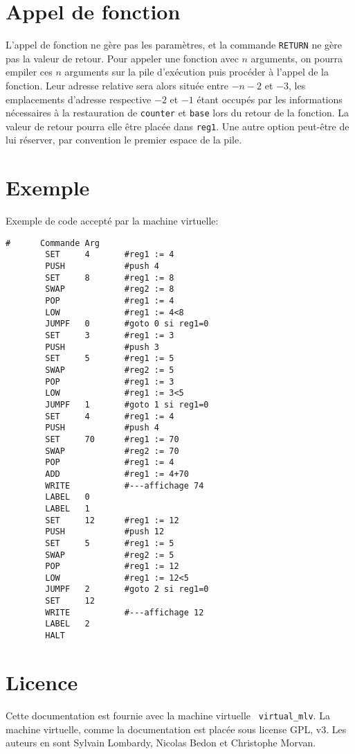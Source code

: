 \documentclass[12pt,a4]{article}
\begin{document}
\section{Appel de fonction}
L'appel de fonction ne gère pas les paramètres, et la commande
{\tt RETURN} ne gère pas la valeur de retour.  Pour appeler une
fonction avec $n$ arguments, on pourra empiler ces $n$ arguments sur
la pile d'exécution puis procéder à l'appel de la fonction. Leur
adresse relative sera alors située entre $-n-2$ et $-3$, les
emplacements d'adresse respective $-2$ et $-1$ étant occupés par les
informations nécessaires à la restauration de {\tt counter} et
{\tt base} lors du retour de la fonction.  La valeur de retour pourra
elle être placée dans {\tt reg1}. Une autre option peut-être de lui
réserver, par convention le premier espace de la pile.

\section{Exemple}
Exemple de code accepté par la machine virtuelle:
\begin{verbatim}
#      Commande Arg
        SET     4       #reg1 := 4
        PUSH            #push 4
        SET     8       #reg1 := 8
        SWAP            #reg2 := 8
        POP             #reg1 := 4
        LOW             #reg1 := 4<8
        JUMPF   0       #goto 0 si reg1=0
        SET     3       #reg1 := 3
        PUSH            #push 3
        SET     5       #reg1 := 5
        SWAP            #reg2 := 5
        POP             #reg1 := 3
        LOW             #reg1 := 3<5
        JUMPF   1       #goto 1 si reg1=0
        SET     4       #reg1 := 4
        PUSH            #push 4
        SET     70      #reg1 := 70
        SWAP            #reg2 := 70
        POP             #reg1 := 4
        ADD             #reg1 := 4+70
        WRITE           #---affichage 74
        LABEL   0
        LABEL   1
        SET     12      #reg1 := 12
        PUSH            #push 12
        SET     5       #reg1 := 5
        SWAP            #reg2 := 5
        POP             #reg1 := 12 
        LOW             #reg1 := 12<5
        JUMPF   2       #goto 2 si reg1=0
        SET     12
        WRITE           #---affichage 12
        LABEL   2
        HALT
\end{verbatim}

\section{Licence}

Cette documentation est fournie avec la machine virtuelle {\tt
  virtual\_mlv}. La machine virtuelle, comme la documentation est
placée sous license GPL, v3. Les auteurs en sont Sylvain Lombardy,
Nicolas Bedon et Christophe Morvan.
\end{document}

